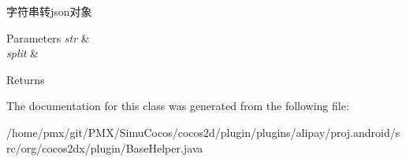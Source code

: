 字符串转json对象 
\begin{DoxyParams}{Parameters}
{\em str} & \\
\hline
{\em split} & \\
\hline
\end{DoxyParams}
\begin{DoxyReturn}{Returns}

\end{DoxyReturn}


The documentation for this class was generated from the following file\+:\begin{DoxyCompactItemize}
\item 
/home/pmx/git/\+P\+M\+X/\+Simu\+Cocos/cocos2d/plugin/plugins/alipay/proj.\+android/src/org/cocos2dx/plugin/Base\+Helper.\+java\end{DoxyCompactItemize}
